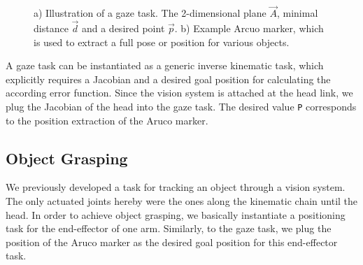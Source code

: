 \begin{figure}[h!]
  \centering
  	\hspace{2cm}
	\caption{a) Illustration of a gaze task. The 2-dimensional plane $\vec{A}$, minimal distance $\vec{d}$ and a desired point $\vec{p}$. b) Example Arcuo marker, which is used to extract a full pose or position for various objects.}
    \label{fig:objectrecognition}
\end{figure}

A gaze task can be instantiated as a generic inverse kinematic task, which explicitly requires a Jacobian and a desired goal position for calculating the according error function. Since the vision system is attached at the head link, we plug the Jacobian of the head into the gaze task. The desired value \verb|P| corresponds to the position extraction of the Aruco marker.

\subsection*{Object Grasping}
We previously developed a task for tracking an object through a vision system. The only actuated joints hereby were the ones along the kinematic chain until the head. In order to achieve object grasping, we basically instantiate a positioning task for the end-effector of one arm. Similarly, to the gaze task, we plug the position of the Aruco marker as the desired goal position for this end-effector task. 

